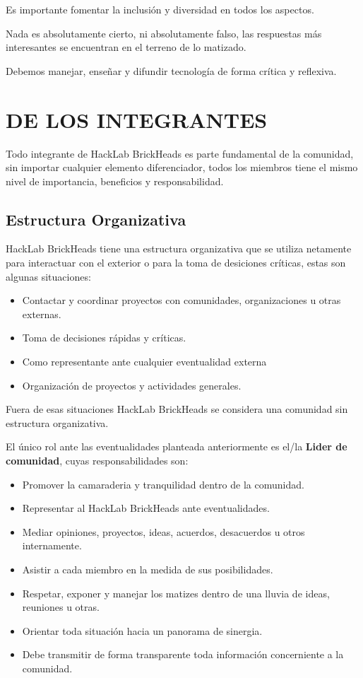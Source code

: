 \documentclass[12pt, letterpaper]{article}
\begin{document}
    Es importante fomentar la inclusión y diversidad en todos los aspectos.

    Nada es absolutamente cierto, ni absolutamente falso, las respuestas más
    interesantes se encuentran en el terreno de lo matizado.

    Debemos manejar, enseñar y difundir tecnología de forma crítica y reflexiva.

    \section{DE LOS INTEGRANTES}
    Todo integrante de HackLab BrickHeads es parte fundamental de la 
    comunidad, sin importar cualquier elemento diferenciador, todos los miembros 
    tiene el mismo nivel de importancia, beneficios y responsabilidad.

    \subsection{Estructura Organizativa}
    HackLab BrickHeads tiene una estructura organizativa que se 
    utiliza netamente para interactuar con el exterior o para la toma de 
    desiciones críticas, estas son algunas situaciones:

    \begin{itemize}
        \item Contactar y coordinar proyectos con comunidades, organizaciones u 
        otras externas.
        \item Toma de decisiones rápidas y críticas.
        \item Como representante ante cualquier eventualidad externa
        \item Organización de proyectos y actividades generales.
    \end{itemize}

    Fuera de esas situaciones HackLab BrickHeads se considera una comunidad 
    sin estructura organizativa.

    El único rol ante las eventualidades planteada anteriormente es el/la
    \textbf{Lider de comunidad}, cuyas responsabilidades son:
    \begin{itemize}
        \item Promover la camaraderia y tranquilidad dentro de la comunidad.
        \item Representar al HackLab BrickHeads ante eventualidades.
        \item Mediar opiniones, proyectos, ideas, acuerdos, desacuerdos u otros 
        internamente. 
        \item Asistir a cada miembro en la medida de sus posibilidades.
        \item Respetar, exponer y manejar los matizes dentro de una lluvia de
        ideas, reuniones u otras.
        \item Orientar toda situación hacia un panorama de sinergia.
        \item Debe transmitir de forma transparente toda información concerniente 
        a la comunidad.
    \end{itemize}
\end{document}
